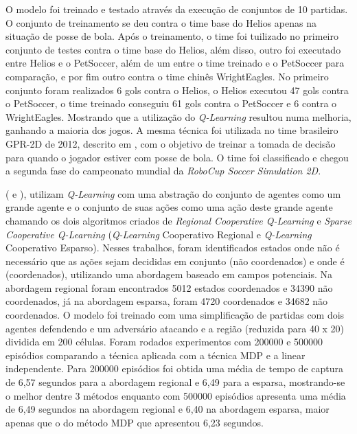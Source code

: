 O modelo foi treinado e testado através da execução de conjuntos de 10 partidas. O conjunto de
treinamento se  deu contra o time base do Helios apenas na situação de posse de bola. Após o
treinamento, o time foi tuilizado no primeiro conjunto de testes contra o time base do Helios, além
disso, outro foi executado entre Helios e o PetSoccer, além de um entre o time treinado e o PetSoccer
para comparação, e por fim outro contra o time chinês WrightEagles. No primeiro conjunto foram
realizados 6 gols contra o Helios, o Helios executou 47 gols contra o PetSoccer, o time treinado
conseguiu 61  gols contra o PetSoccer e 6 contra o WrightEagles. Mostrando que a utilização do
\textit{Q-Learning} resultou numa melhoria, ganhando a maioria dos jogos. A mesma técnica foi
utilizada no time brasileiro GPR-2D de 2012, descrito em , com o objetivo de
treinar a tomada de decisão para quando o jogador estiver com posse de bola. O time foi classificado
e chegou a segunda fase do campeonato mundial da \textit{RoboCup Soccer Simulation 2D}.

 (\citeyear{liu2008regional} e \citeyear{liu2009sparse}), utilizam
\textit{Q-Learning} com uma abstração do conjunto de agentes como um grande agente e o conjunto de
suas ações como uma ação deste grande agente chamando os dois algoritmos criados de \textit{Regional
Cooperative Q-Learning} e \textit{Sparse Cooperative Q-Learning} (\textit{Q-Learning} Cooperativo
Regional e \textit{Q-Learning} Cooperativo Esparso). Nesses trabalhos, foram identificados estados
onde não é necessário que as ações sejam decididas em conjunto (não coordenados) e onde é
(coordenados), utilizando uma abordagem baseado em campos potenciais. Na abordagem regional foram
encontrados 5012 estados coordenados e 34390 não coordenados, já na abordagem esparsa, foram 4720
coordenados e 34682 não coordenados. O modelo foi treinado  com uma simplificação de partidas com
dois agentes defendendo e um adversário atacando e a região (reduzida para 40 x 20) dividida em 200
células. Foram rodados experimentos com 200000 e 500000 episódios comparando a técnica aplicada com
a técnica MDP e a linear independente. Para 200000 episódios foi obtida uma média de tempo de
captura de 6,57 segundos para a abordagem regional e 6,49 para a esparsa, mostrando-se o melhor
dentre 3 métodos enquanto com 500000 episódios apresenta uma média de 6,49 segundos na abordagem
regional e 6,40 na abordagem esparsa, maior apenas que o do método MDP que apresentou 6,23 segundos.


